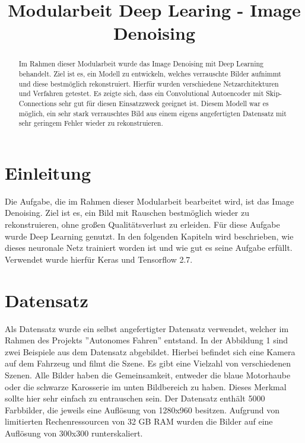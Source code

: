 \documentclass[conference]{IEEEtran}
\begin{document}
	
\title{\LARGE Modularbeit Deep Learing - Image Denoising}

\author{
}
	
\maketitle

\begin{abstract}
Im Rahmen dieser Modularbeit wurde das Image Denoising mit Deep Learning behandelt. Ziel ist es, ein Modell zu entwickeln, welches verrauschte Bilder aufnimmt und diese bestmöglich rekonstruiert. Hierfür wurden verschiedene Netzarchitekturen und Verfahren getestet. Es zeigte sich, dass ein Convolutional Autoencoder mit Skip-Connections sehr gut für diesen Einsatzzweck geeignet ist. Diesem Modell war es möglich, ein sehr stark verrauschtes Bild aus einem eigens angefertigten Datensatz mit sehr geringem Fehler wieder zu rekonstruieren.
\end{abstract}

\section{Einleitung}
Die Aufgabe, die im Rahmen dieser Modularbeit bearbeitet wird, ist das Image Denoising. Ziel ist es, ein Bild mit Rauschen bestmöglich wieder zu rekonstruieren, ohne großen Qualitätsverlust zu erleiden. Für diese Aufgabe wurde Deep Learning genutzt. In den folgenden Kapiteln wird beschrieben, wie dieses neuronale Netz trainiert worden ist und wie gut es seine Aufgabe erfüllt. Verwendet wurde hierfür Keras und Tensorflow 2.7.

\section{Datensatz}\label{Datensatz}
Als Datensatz wurde ein selbst angefertigter Datensatz verwendet, welcher im Rahmen des Projekts ''Autonomes Fahren'' entstand. In der Abbildung 1 sind zwei Beispiele aus dem Datensatz abgebildet. Hierbei befindet sich eine Kamera auf dem Fahrzeug und filmt die Szene. Es gibt eine Vielzahl von verschiedenen Szenen. Alle Bilder haben die Gemeinsamkeit, entweder die blaue Motorhaube oder die schwarze Karosserie im unten Bildbereich zu haben. Dieses Merkmal sollte hier sehr einfach zu entrauschen sein. Der Datensatz enthält 5000 Farbbilder, die jeweils eine Auflösung von 1280x960 besitzen. Aufgrund von limitierten Rechenressourcen von 32 GB RAM wurden die Bilder auf eine Auflösung von 300x300 runterskaliert.\\
\end{document}
